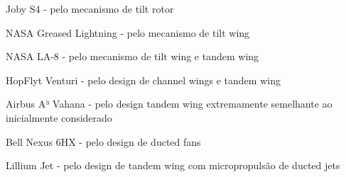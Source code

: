 \item Joby S4 - pelo mecanismo de tilt rotor
\item NASA Greased Lightning - pelo mecanismo de tilt wing
\item NASA LA-8 - pelo mecanismo de tilt wing e tandem wing
\item HopFlyt Venturi - pelo design de channel wings e tandem wing
\item Airbus A³ Vahana - pelo design tandem wing extremamente semelhante ao inicialmente considerado
\item Bell Nexus 6HX - pelo design de ducted fans
\item Lillium Jet - pelo design de tandem wing com micropropulsão de ducted jets